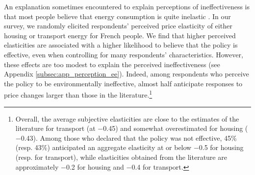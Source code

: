 \documentclass[12pt]{article} %
\begin{document}
An explanation sometimes encountered to explain perceptions of ineffectiveness is that most people believe that energy consumption is quite inelastic \citep{kallbekken_saelen_2011,carattini_overcoming_2018}. In our survey, we randomly elicited respondents' perceived price elasticity of either housing or transport energy for French people. We find that higher perceived elasticities are associated with a higher likelihood to believe that the policy is effective, even when controlling for many respondents' characteristics. However, these effects are too modest to explain the perceived ineffectiveness (see Appendix \ref{subsec:app_perception_ee}). Indeed, among respondents who perceive the policy to be environmentally ineffective, almost half anticipate responses to price changes larger than those in the literature.\footnote{Overall, the average subjective elasticities are close to the estimates of the literature for transport (at $-$0.45) and somewhat overestimated for housing ($-$0.43). Among those who declared that the policy was not effective, 45\% (resp. 43\%) anticipated an aggregate elasticity at or below $-$0.5 for housing (resp. for transport), while elasticities obtained from the literature are approximately $-$0.2 for housing and $-$0.4 for transport.\label{fnel}}
\end{document}
